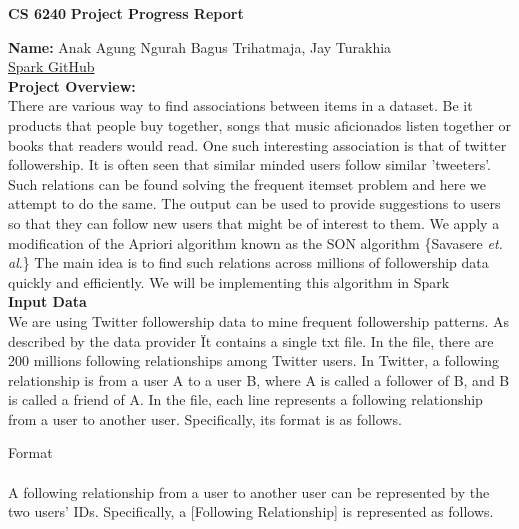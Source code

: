\documentclass[11pt]{article}
\begin{document}
    \thispagestyle{empty}
    \setlength{\parindent}{0pt}
    \setlength{\parskip}{1.8ex}
    \lstset{language=Scala}
    \newcommand{\hs}{\hspace{.1in}}

    \begin{center}
        \Large{\bf CS 6240}
        \Large{\bf Project Progress Report}
    \end{center}
    \medskip

\begin{center}

{\bf Name:}  Anak Agung Ngurah Bagus Trihatmaja, Jay Turakhia \\
\href{https://github.ccs.neu.edu/prdx/CS6240-Project}{Spark GitHub}  \\
{\bf Project Overview: }\\ There are various way to find associations between items in a dataset. Be it products that people buy together, songs that music aficionados listen together or books that readers would read. One such interesting association is that of twitter followership. It is often seen that similar minded users follow similar 'tweeters'.\\
Such relations can be found solving the frequent itemset problem and here we attempt to do the same. The output can be used to provide suggestions to users so that they can follow new users that might be of interest to them. We apply a modification of the Apriori algorithm known as the SON algorithm \{Savasere \textit  {et. al}.\} The main idea is to find such relations across millions of followership data quickly and efficiently. We will be implementing this algorithm in Spark\\

{\bf Input Data} \\
We are using Twitter followership data to mine frequent followership patterns. As described by the data provider \" It contains a single txt file. In the file, there are 200 millions following relationships among Twitter users. In Twitter, a following relationship is from a user A to a user B, where A is called a follower of B, and B is called a friend of A. In the file, each line represents a following relationship from a user to another user. Specifically, its format is as follows.

Format\\
[Following Relationship 1] \\
[Following Relationship 2]

A following relationship from a user to another user can be represented by the two users' IDs. Specifically, a [Following Relationship] is represented as follows.


\end{center}
\end{document}
